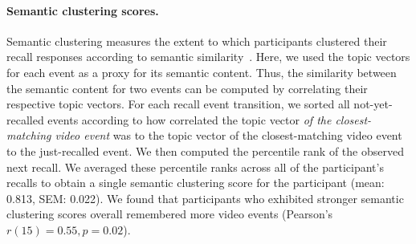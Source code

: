 \documentclass{article}
\begin{document}
\paragraph{Semantic clustering scores.} Semantic clustering measures the extent to which participants clustered their recall responses according to semantic similarity~\citep{PolyEtal09}. Here, we used the topic vectors for each event as a proxy for its semantic content. Thus, the similarity between the semantic content for two events can be computed by correlating their respective topic vectors.  For each recall event transition, we sorted all not-yet-recalled events according to how correlated the topic vector \textit{of the closest-matching video event} was to the topic vector of the closest-matching video event to the just-recalled event.  We then computed the percentile rank of the observed next recall.  We averaged these percentile ranks across all of the participant's recalls to obtain a single semantic clustering score for the participant (mean: 0.813, SEM: 0.022).  We found that participants who exhibited stronger semantic clustering scores overall remembered more video events (Pearson's $r(15) = 0.55, p = 0.02$).



\end{document}
